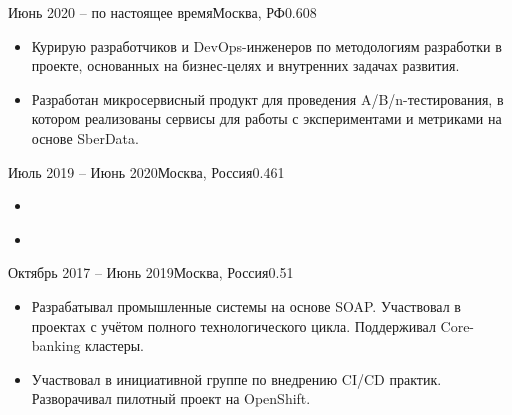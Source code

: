\documentclass[10pt,a4paper,ragged2e]{maincv}
\begin{document}

\begin{fullwidth}
\makecvheader
\end{fullwidth}



{Июнь 2020 -- по настоящее время}{Москва, РФ}{0.608}
\begin{itemize}
\item {\justify
{Курирую разработчиков и DevOps-инженеров по методологиям разработки в проекте, основанных на бизнес-целях и внутренних
 задачах развития.}}
\smallskip
\item {\justify
{Разработан микросервисный продукт для проведения A/B/n-тестирования, в котором реализованы сервисы для работы
 с экспериментами и метриками на основе SberData.}}
\end{itemize}

\divider

{Июль 2019 -- Июнь 2020}{Москва, Россия}{0.461}
\begin{itemize}
\item {}
\smallskip
\item
{
}
\end{itemize}

\divider

{Октябрь 2017 -- Июнь 2019}{Москва, Россия}{0.51}
\begin{itemize}
\item {Разрабатывал промышленные системы на основе SOAP. Участвовал в проектах с учётом полного технологического цикла.
 Поддерживал Core-banking кластеры.}
\smallskip
\item {Участвовал в инициативной группе по внедрению CI/CD практик. Разворачивал пилотный проект на OpenShift.}
\end{itemize}
\end{document}
